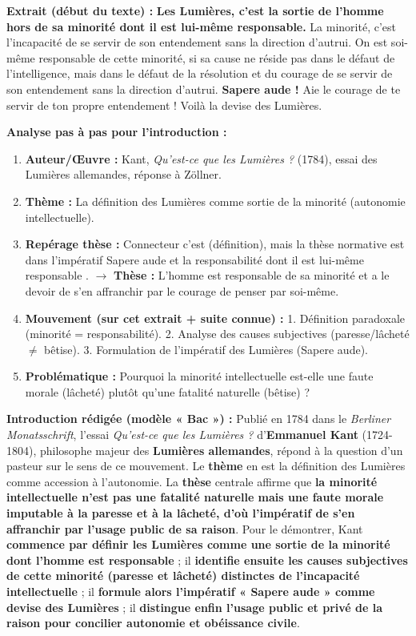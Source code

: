 \documentclass[11pt]{article}
\newcommand{\cle}[1]{{\popxbold\color{popdark}#1}}
\begin{document}
\begin{experience}
\textbf{Extrait (début du texte) :}
\guillemotleft \textbf{Les Lumières, c'est la sortie de l'homme hors de sa minorité dont il est lui-même responsable.} La minorité, c'est l'incapacité de se servir de son entendement sans la direction d'autrui. On est soi-même responsable de cette minorité, si sa cause ne réside pas dans le défaut de l'intelligence, mais dans le défaut de la résolution et du courage de se servir de son entendement sans la direction d'autrui. \textbf{Sapere aude !} Aie le courage de te servir de ton propre entendement ! Voilà la devise des Lumières. \guillemotright
\par \textbf{Analyse pas à pas pour l'introduction :}
\begin{enumerate}
    \item \textbf{Auteur/Œuvre :} Kant, \emph{Qu'est-ce que les Lumières ?} (1784), essai des Lumières allemandes, réponse à Zöllner.
    \item \textbf{Thème :} La définition des Lumières comme \cle{sortie de la minorité} (autonomie intellectuelle).
    \item \textbf{Repérage thèse :} Connecteur \guillemotleft c'est \guillemotright (définition), mais la thèse normative est dans l'impératif \guillemotleft Sapere aude \guillemotright et la responsabilité \guillemotleft dont il est lui-même responsable \guillemotright. $\rightarrow$ \textbf{Thèse :} L'homme est responsable de sa minorité et a le devoir de s'en affranchir par le courage de penser par soi-même.
    \item \textbf{Mouvement (sur cet extrait + suite connue) :} 1. Définition paradoxale (minorité = responsabilité). 2. Analyse des causes subjectives (paresse/lâcheté $\neq$ bêtise). 3. Formulation de l'impératif des Lumières (Sapere aude).
    \item \textbf{Problématique :} \guillemotleft Pourquoi la minorité intellectuelle est-elle une faute morale (lâcheté) plutôt qu'une fatalité naturelle (bêtise) ? \guillemotright
\end{enumerate}
\textbf{Introduction rédigée (modèle « Bac ») :}
\guillemotleft Publié en 1784 dans le \emph{Berliner Monatsschrift}, l'essai \emph{Qu'est-ce que les Lumières ?} d'\textbf{Emmanuel Kant} (1724-1804), philosophe majeur des \textbf{Lumières allemandes}, répond à la question d'un pasteur sur le sens de ce mouvement. Le \textbf{thème} en est la définition des Lumières comme accession à l'autonomie. La \textbf{thèse} centrale affirme que \textbf{la minorité intellectuelle n'est pas une fatalité naturelle mais une faute morale imputable à la paresse et à la lâcheté, d'où l'impératif de s'en affranchir par l'usage public de sa raison}. Pour le démontrer, Kant \textbf{commence par définir les Lumières comme une sortie de la minorité dont l'homme est responsable} ; il \textbf{identifie ensuite les causes subjectives de cette minorité (paresse et lâcheté) distinctes de l'incapacité intellectuelle} ; il \textbf{formule alors l'impératif « Sapere aude » comme devise des Lumières} ; il \textbf{distingue enfin l'usage public et privé de la raison pour concilier autonomie et obéissance civile}. \guillemotright

\end{experience}
\end{document}
